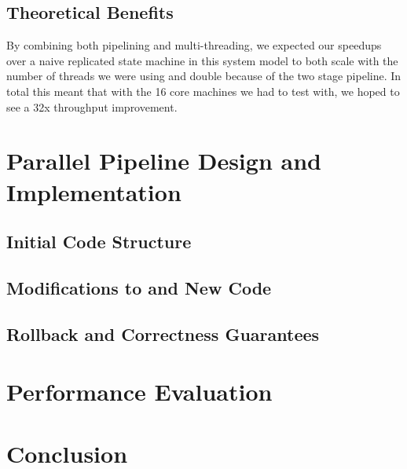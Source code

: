\documentclass[11pt, oneside]{report}
\begin{document}
\subsection{Theoretical Benefits}

By combining both pipelining and multi-threading, we expected our speedups over a naive replicated state machine in this system model to both scale with the number of threads we were using and double because of the two stage pipeline. In total this meant that with the 16 core machines we had to test with, we hoped to see a 32x throughput improvement.

\section{Parallel Pipeline Design and Implementation}

\subsection{Initial Code Structure}

\subsection{Modifications to and New Code}

\subsection{Rollback and Correctness Guarantees}

\section{Performance Evaluation}

\section{Conclusion}
\end{document}
